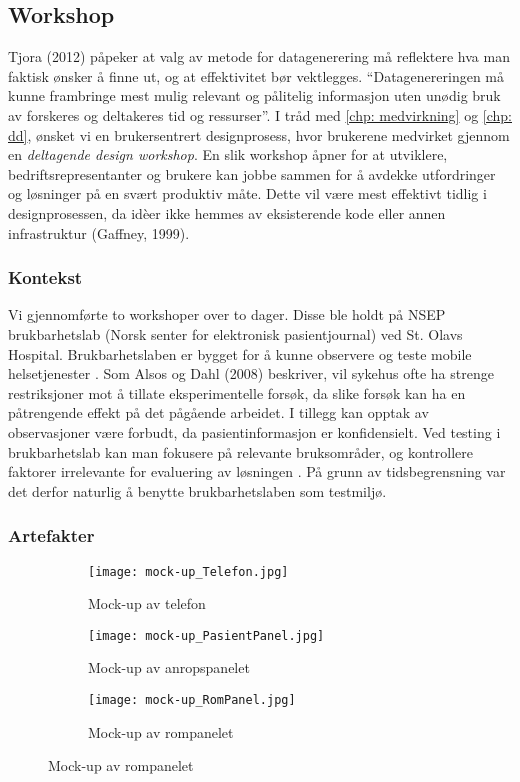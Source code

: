 \subsection{Workshop}
\label{workshops}

Tjora (2012) påpeker at valg av metode for datagenerering må reflektere hva man faktisk ønsker å finne ut, og at effektivitet bør vektlegges. “Datagenereringen må kunne frambringe mest mulig relevant og pålitelig informasjon uten unødig bruk av forskeres og deltakeres tid og ressurser”.
I tråd med \ref{chp: medvirkning} og \ref{chp: dd}, ønsket vi en brukersentrert designprosess, hvor brukerene medvirket gjennom en \emph{deltagende design workshop}.
En slik workshop åpner for at utviklere, bedriftsrepresentanter og brukere kan jobbe sammen for å avdekke utfordringer og løsninger på en svært produktiv måte. Dette vil være mest effektivt tidlig i designprosessen, da idèer ikke hemmes av eksisterende kode eller annen infrastruktur (Gaffney, 1999).

\subsubsection{Kontekst}
Vi gjennomførte to workshoper over to dager. Disse ble holdt på NSEP brukbarhetslab (Norsk senter for elektronisk pasientjournal) ved St. Olavs Hospital. Brukbarhetslaben er bygget for å kunne observere og teste mobile helsetjenester \cite{NSEP}.
Som Alsos og Dahl (2008) beskriver, vil sykehus ofte ha strenge restriksjoner mot å tillate eksperimentelle forsøk, da slike forsøk kan ha en påtrengende effekt på det pågående arbeidet. I tillegg kan opptak av observasjoner være forbudt, da pasientinformasjon er konfidensielt. Ved testing i brukbarhetslab kan man fokusere på relevante bruksområder, og kontrollere faktorer irrelevante for evaluering av løsningen \cite{Alsos08}. På grunn av tidsbegrensning var det derfor naturlig å benytte brukbarhetslaben som testmiljø.   


\subsubsection{Artefakter}
\begin{figure}[H]
	\centering
	\begin{subfigure}[b]{0.25\textwidth}
		\centering
		\texttt{[image: mock-up\_Telefon.jpg]}
		\caption{Mock-up av telefon}
		\label{mock-up_Telefon}
	\end{subfigure}
	\begin{subfigure}[b]{0.35\textwidth}
		\centering
		\texttt{[image: mock-up\_PasientPanel.jpg]}
		\caption{Mock-up av anropspanelet}
		\label{mock-up_PasientPanel}
	\end{subfigure}
	\begin{subfigure}[b]{0.35\textwidth}
		\centering
		\texttt{[image: mock-up\_RomPanel.jpg]}
		\caption{Mock-up av rompanelet}
		\label{mock-up_RomPanel}
	\end{subfigure}
\end{figure}

